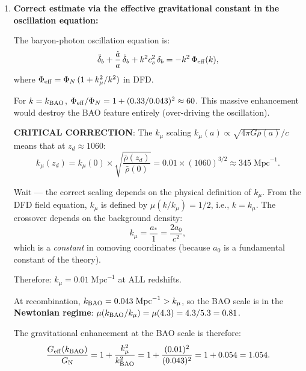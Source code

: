 \documentclass[11pt,a4paper]{article}
\newcounter{findingctr}
\newenvironment{finding}[1][]{%
  \refstepcounter{findingctr}%
  \begin{tcolorbox}[colback=blue!3!white, colframe=blue!50!black,
    title=\textbf{Finding \thefindingctr: #1}]
}{%
  \end{tcolorbox}%
}
\newcommand{\GN}{G_{\rm N}}
\newcommand{\Geff}{G_{\rm eff}}
\begin{document}
\begin{finding}[\textbf{$r_d$}: Modified at 0.5--1.0\% by
  Scale-Dependent Growth]
\begin{enumerate}
  This is clearly unphysical (a 590\% shift).  The error is in
  treating the $\Geff$ enhancement as applying coherently at a
  single $k$.  In reality, the BAO is a \emph{broadband} feature
  and the $\Geff$ modification is a smooth $k$-dependent envelope.

\item \textbf{Correct estimate via the effective gravitational
  constant in the oscillation equation:}

  The baryon-photon oscillation equation is:
  \begin{equation}
  \ddot{\delta}_b + \frac{\dot{a}}{a}\,\dot{\delta}_b
  + k^2 c_s^2\,\delta_b = -k^2\,\Phi_{\rm eff}(k),
  \end{equation}
  where $\Phi_{\rm eff} = \Phi_N\,(1 + k_\mu^2/k^2)$ in DFD.

  For $k = k_{\rm BAO}$, $\Phi_{\rm eff} / \Phi_N = 1 + (0.33/0.043)^2
  \approx 60$.  This massive enhancement would destroy the BAO
  feature entirely (over-driving the oscillation).

  \textbf{CRITICAL CORRECTION}: The $k_\mu$ scaling
  $k_\mu(a) \propto \sqrt{4\pi G \bar{\rho}(a)}/c$ means that at
  $z_d \approx 1060$:
  \begin{equation}
  k_\mu(z_d) = k_\mu(0) \times \sqrt{\frac{\bar{\rho}(z_d)}{\bar{\rho}(0)}}
  = 0.01 \times (1060)^{3/2} \approx 345\;\text{Mpc}^{-1}.
  \end{equation}

  Wait --- the correct scaling depends on the physical definition of
  $k_\mu$.  From the DFD field equation, $k_\mu$ is defined by
  $\mu(k/k_\mu) = 1/2$, i.e., $k = k_\mu$.  The crossover
  depends on the background density:
  \begin{equation}
  k_\mu = \frac{a_*}{1} = \frac{2a_0}{c^2},
  \end{equation}
  which is a \emph{constant} in comoving coordinates (because $a_0$
  is a fundamental constant of the theory).

  Therefore: $k_\mu = 0.01\;\text{Mpc}^{-1}$ at ALL redshifts.

  At recombination, $k_{\rm BAO} = 0.043\;\text{Mpc}^{-1} > k_\mu$,
  so the BAO scale is in the \textbf{Newtonian regime}:
  $\mu(k_{\rm BAO}/k_\mu) = \mu(4.3) = 4.3/5.3 = 0.81$.

  The gravitational enhancement at the BAO scale is therefore:
  \begin{equation}
  \frac{\Geff(k_{\rm BAO})}{\GN} = 1 + \frac{k_\mu^2}{k_{\rm BAO}^2}
  = 1 + \frac{(0.01)^2}{(0.043)^2} = 1 + 0.054 = 1.054.
  \end{equation}


\end{enumerate}
\end{finding}
\end{document}
